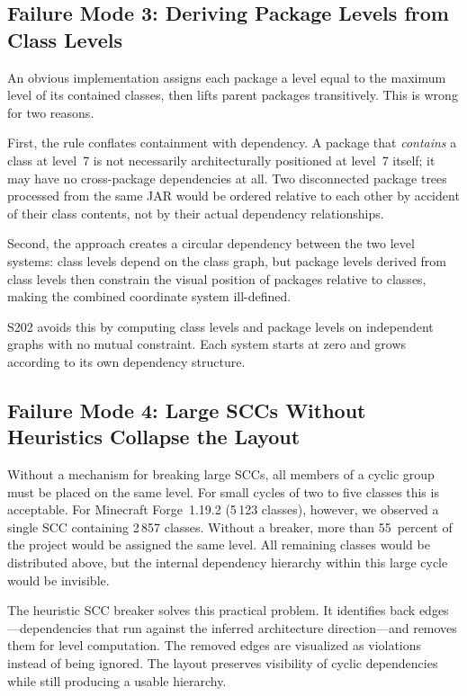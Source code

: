 \documentclass[a4paper,twoside]{article}
\begin{document}
\subsection*{Failure Mode 3: Deriving Package Levels from Class Levels}

An obvious implementation assigns each package a level equal to the maximum
level of its contained classes, then lifts parent packages transitively.
This is wrong for two reasons.

First, the rule conflates containment with dependency. A package that
\emph{contains} a class at level~7 is not necessarily architecturally
positioned at level~7 itself; it may have no cross-package dependencies
at all. Two disconnected package trees processed from the same JAR would
be ordered relative to each other by accident of their class contents,
not by their actual dependency relationships.

Second, the approach creates a circular dependency between the two
level systems: class levels depend on the class graph, but package levels
derived from class levels then constrain the visual position of packages
relative to classes, making the combined coordinate system ill-defined.

S202 avoids this by computing class levels and package levels on
independent graphs with no mutual constraint. Each system starts at zero and
grows according to its own dependency structure.

\subsection*{Failure Mode 4: Large SCCs Without Heuristics Collapse
the Layout}

Without a mechanism for breaking large SCCs, all members of a cyclic group must
be placed on the same level. For small cycles of two to five classes this is
acceptable. For Minecraft Forge~1.19.2 (5\,123 classes), however, we observed a single
SCC containing 2\,857 classes. Without a breaker, more than 55~percent of the
project would be assigned the same level. All remaining classes would be
distributed above, but the internal dependency hierarchy within this large
cycle would be invisible.

The heuristic SCC breaker solves this practical problem. It identifies back
edges---dependencies that run against the inferred architecture direction---and
removes them for level computation. The removed edges are visualized as
violations instead of being ignored. The layout preserves visibility of
cyclic dependencies while still producing a usable hierarchy.
\end{document}
